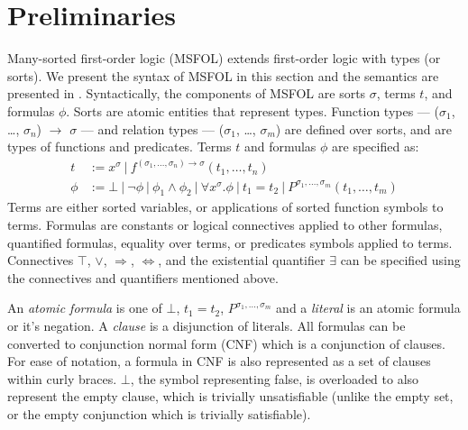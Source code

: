 \documentclass[11pt]{article}
\begin{document}
\section{Preliminaries}
\label{sec:prelims}
	Many-sorted first-order logic (MSFOL)
	extends first-order logic with 
	types (or sorts). We present the 
	syntax of MSFOL in this section and the 
	semantics are presented in
	\cite{Barrett2018}. Syntactically, 
	the components of MSFOL are sorts 
	$\sigma$, terms $t$, and 
	formulas $\phi$. Sorts are 
	atomic entities that 
	represent types. Function types 
	--- ($\sigma_1$, \ldots, $\sigma_n$) 
	$\to$ $\sigma$ ---
	and relation types 
	--- ($\sigma_1$, \ldots, $\sigma_m$)
	are defined over sorts, and 
	are types of functions and 
	predicates. Terms $t$ and 
	formulas $\phi$ are specified as:
	\begin{align*}
	t &:= x^{\sigma}\ |\ 
	f^{(\sigma_1, \ldots, \sigma_n) \to 
		\sigma}	(t_1, \ldots, t_n)\\
	\phi &:= \bot\ |\ \neg \phi\ |\ 
	\phi_1 \land \phi_2\ |\ \forall 
	x^{\sigma} . \phi\ |\ t_1 = t_2
	\ |\ P^{\sigma_1,\ldots,\sigma_m}
	(t_1, \ldots, t_m)
	\end{align*}
	Terms are either sorted variables, 
	or applications of sorted function
	symbols to terms.
	Formulas are constants or logical 
	connectives applied to other 
	formulas, quantified formulas, 
	equality over terms, or predicates
	symbols applied to terms. Connectives 
	$\top$, $\lor$, $\Rightarrow$, 
	$\Leftrightarrow$, and the 
	existential	quantifier $\exists$ 
	can be specified using the connectives 
	and quantifiers mentioned above.
	
	An \textit{atomic formula} is one 
	of $\bot$, $t_1 = t_2$, 
	$P^{\sigma_1,\ldots,\sigma_m}$ and a 
	\textit{literal} is an atomic 
	formula or it's negation. 
	A \textit{clause} is a 
	disjunction of literals. All formulas 
	can be converted to conjunction normal 
	form (CNF) which is a conjunction of 
	clauses. For ease of notation, 
	a formula in CNF is also represented
	as a set of clauses within curly 
	braces. $\bot$, the symbol
	representing false, 
	is overloaded to also represent
	the empty clause, which is trivially
	unsatisfiable (unlike the empty set,
	or the empty conjunction which is 
	trivially satisfiable).
	
\end{document}
